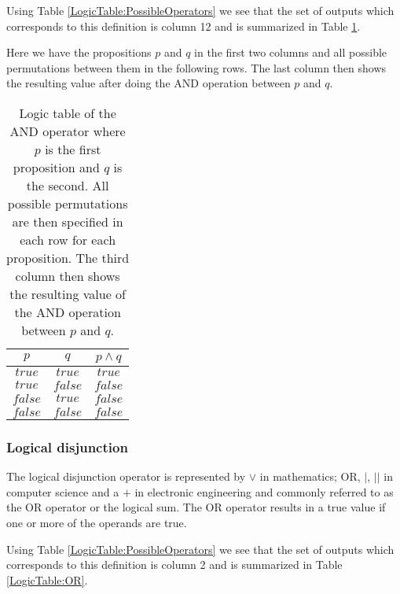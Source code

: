                 Using Table \ref{LogicTable:PossibleOperators} we see that the set of outputs which corresponds to this definition is column 12 and is summarized in Table \ref{LogicTable:AND}. 
                
                Here we have the propositions $p$ and $q$ in the first two columns and all possible permutations between them in the following rows. The last column then shows the resulting value after doing the AND operation between $p$ and $q$. 
                
                \begin{table}[h!]
                    \centering
                    \begin{tabular}{|c|c|c|}
                    	\hline
                    	  $p$   &   $q$   & $p \wedge q$ \\ \hline
                    	$true$  & $true$  &    $true$    \\ \hline
                    	$true$  & $false$ &   $false$    \\ \hline
                    	$false$ & $true$  &   $false$    \\ \hline
                    	$false$ & $false$ &   $false$    \\ \hline
                    \end{tabular}
                    \caption{Logic table of the AND operator where $p$ is the first proposition and $q$ is the second. All possible permutations are then specified in each row for each proposition. The third column then shows the resulting value of the AND operation between $p$ and $q$.}
                    \label{LogicTable:AND}
                \end{table}
            
            \subsubsection{Logical disjunction}
            
                The logical disjunction operator is represented by $\vee$ in mathematics; OR, $\vert$, $\vert \vert$  in computer science and a $+$ in electronic engineering and commonly referred to as the OR operator or the logical sum. The OR operator results in a true value if one or more of the operands are true.
                
                Using Table \ref{LogicTable:PossibleOperators} we see that the set of outputs which corresponds to this definition is column 2 and is summarized in Table \ref{LogicTable:OR}. 
                
